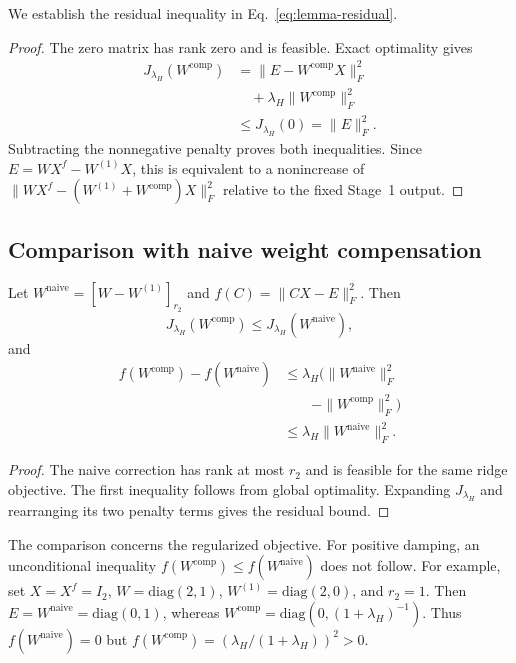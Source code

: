 We establish the residual inequality in Eq.~\eqref{eq:lemma-residual}.

\begin{proof}
The zero matrix has rank zero and is feasible. Exact optimality gives
\begin{equation}
\begin{aligned}
J_{\lambda_H}(W^{\mathrm{comp}})
&=\|E-W^{\mathrm{comp}}X\|_F^2\\
&\quad+\lambda_H\|W^{\mathrm{comp}}\|_F^2\\
&\le J_{\lambda_H}(0)=\|E\|_F^2.
\end{aligned}
\end{equation}
Subtracting the nonnegative penalty proves both inequalities. Since $E=WX^f-W^{(1)}X$, this is equivalent to a nonincrease of $\|WX^f-(W^{(1)}+W^{\mathrm{comp}})X\|_F^2$ relative to the fixed Stage~1 output.
\end{proof}

\subsection{Comparison with naive weight compensation}\label{sup:proof-corollary1}

\begin{corollary*}
Let $W^{\mathrm{naive}}=[W-W^{(1)}]_{r_2}$ and $f(C)=\|CX-E\|_F^2$. Then
\begin{equation}
J_{\lambda_H}(W^{\mathrm{comp}})
\le J_{\lambda_H}(W^{\mathrm{naive}}),
\end{equation}
and
\begin{equation}
\begin{aligned}
f(W^{\mathrm{comp}})-f(W^{\mathrm{naive}})
&\le\lambda_H\big(\|W^{\mathrm{naive}}\|_F^2 \\
&\qquad-\|W^{\mathrm{comp}}\|_F^2\big) \\
&\le\lambda_H\|W^{\mathrm{naive}}\|_F^2.
\end{aligned}
\end{equation}
\end{corollary*}

\begin{proof}
The naive correction has rank at most $r_2$ and is feasible for the same ridge objective. The first inequality follows from global optimality. Expanding $J_{\lambda_H}$ and rearranging its two penalty terms gives the residual bound.
\end{proof}

The comparison concerns the regularized objective. For positive damping, an unconditional inequality $f(W^{\mathrm{comp}})\le f(W^{\mathrm{naive}})$ does not follow. For example, set $X=X^f=I_2$, $W=\mathrm{diag}(2,1)$, $W^{(1)}=\mathrm{diag}(2,0)$, and $r_2=1$. Then $E=W^{\mathrm{naive}}=\mathrm{diag}(0,1)$, whereas $W^{\mathrm{comp}}=\mathrm{diag}(0,(1+\lambda_H)^{-1})$. Thus $f(W^{\mathrm{naive}})=0$ but $f(W^{\mathrm{comp}})=(\lambda_H/(1+\lambda_H))^2>0$.

